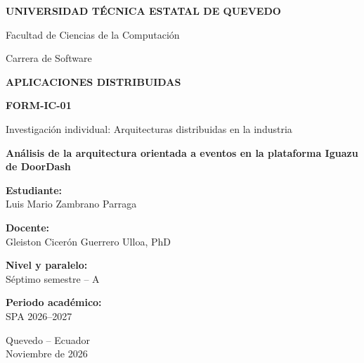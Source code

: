 \begin{titlepage}
    \centering

    {\Large\bfseries
    UNIVERSIDAD TÉCNICA ESTATAL DE QUEVEDO\par}

    \vspace{0.5cm}

    {\large
    Facultad de Ciencias de la Computación\par}

    {\large
    Carrera de Software\par}

    \vspace{2cm}

    {\Large\bfseries
    APLICACIONES DISTRIBUIDAS\par}

    \vspace{1cm}

    {\large\bfseries
    FORM-IC-01\par}

    \vspace{0.3cm}

    {\large
    Investigación individual: Arquitecturas
    distribuidas en la industria\par}

    \vspace{1.5cm}

    {\Large\bfseries
    Análisis de la arquitectura orientada a eventos
    en la plataforma Iguazu de DoorDash\par}

    \vfill

    \textbf{Estudiante:}\\
    Luis Mario Zambrano Parraga

    \vspace{0.5cm}

    \textbf{Docente:}\\
    Gleiston Cicerón Guerrero Ulloa, PhD

    \vspace{0.5cm}

    \textbf{Nivel y paralelo:}\\
    Séptimo semestre -- A

    \vspace{0.5cm}

    \textbf{Periodo académico:}\\
    SPA 2026--2027

    \vfill

    Quevedo -- Ecuador\\
    Noviembre de 2026

\end{titlepage}
